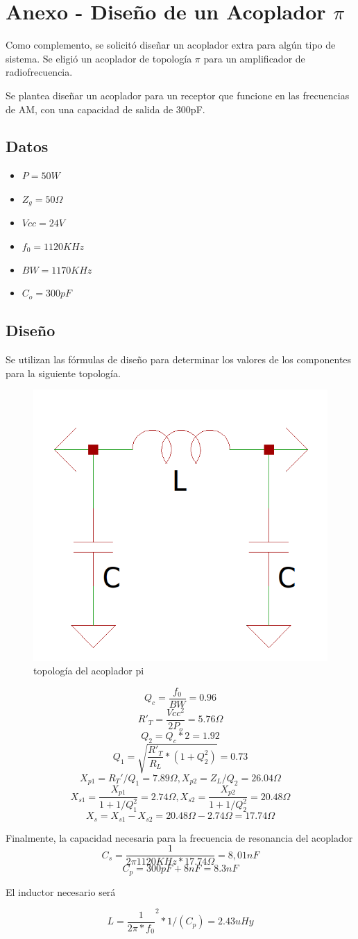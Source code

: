 \section{Anexo - Diseño de un Acoplador $\pi$}
Como complemento, se solicitó diseñar un acoplador extra para algún tipo de sistema. Se eligió un acoplador de topología $\pi$ para un amplificador de radiofrecuencia.

Se plantea diseñar un acoplador para un receptor que funcione en las frecuencias de AM, con una capacidad de salida de 300pF.

\subsection{Datos}

\begin{itemize}
    \item $P =50W$
    \item $Z_g = 50\Omega$
    \item $Vcc = 24V$
    \item $f_0 = 1120KHz$
    \item $BW = 1170KHz$
    \item $C_o = 300pF$
\end{itemize}

\subsection{Diseño}
Se utilizan las fórmulas de diseño para determinar los valores de los componentes para la siguiente topología.

\begin{figure}[H]
    \centering
    \includegraphics[width=0.5\linewidth]{fig/acopladorpi.png}
    \caption{topología del acoplador pi}
    \label{fig:enter-label}
\end{figure}

$$
Q_c = \frac{f_0}{BW} = 0.96
$$
$$
R'_T = \frac{Vcc^2}{2P_o} = 5.76\Omega
$$
$$
Q_2 = Q_c*2 = 1.92
$$
$$
Q_1 = \sqrt{\frac{R'_T}{R_L}*(1+Q_2^2)} = 0.73
$$
$$
X_{p1} =R_T'/Q_1=7.89\Omega, X_{p2} = Z_L/Q_2 = 26.04\Omega
$$
$$
X_{s1} = \frac{X_{p1}}{1+1/Q_1^2} = 2.74\Omega, X_{s2} = \frac{X_{p2}}{1+1/Q_2^2} = 20.48\Omega
$$
$$
X_s = X_{s1}-X_{s2} = 20.48\Omega-2.74\Omega = 17.74\Omega
$$

Finalmente, la capacidad necesaria para la frecuencia de resonancia del acoplador
$$
C_s = \frac{1}{2\pi1120KHz*17.74\Omega} = 8,01nF
$$
$$
C_p = 300pF+8nF = 8.3nF
$$

El inductor necesario será

$$
L = {\frac{1}{2\pi*f_0}}^2*1/(C_p) = 2.43uHy
$$

